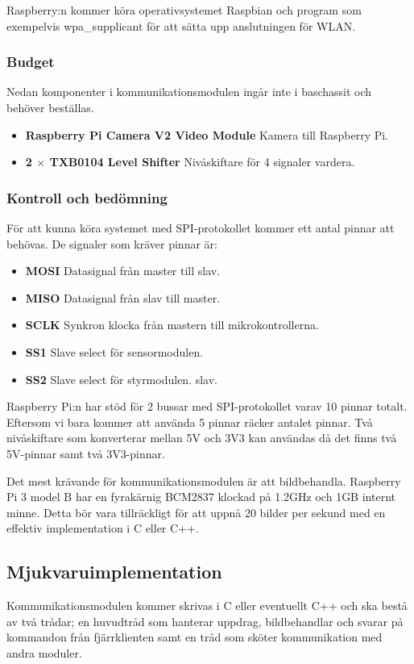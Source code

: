 \documentclass[designspec/spec.tex]{subfiles}
\begin{document}
Raspberry:n kommer köra operativsystemet Raspbian och program som exempelvis
wpa\_supplicant för att sätta upp anslutningen för WLAN.

\subsubsection{Budget}
    Nedan komponenter i kommunikationsmodulen ingår inte i baschassit och
    behöver beställas.
\begin{itemize}
    \item \textbf{Raspberry Pi Camera V2 Video Module} Kamera till Raspberry
    Pi.
    \item \textbf{2 $\times$ TXB0104 Level Shifter} Nivåskiftare för 4 signaler
    vardera.
\end{itemize}

\subsubsection{Kontroll och bedömning}
För att kunna köra systemet med SPI-protokollet kommer ett antal pinnar att
behövas. De signaler som kräver pinnar är:
\begin{itemize}
    \item \textbf{MOSI} Datasignal från master till slav.
    \item \textbf{MISO} Datasignal från slav till master.
    \item \textbf{SCLK} Synkron klocka från mastern till mikrokontrollerna.
    \item \textbf{SS1} Slave select för sensormodulen.
    \item \textbf{SS2} Slave select för styrmodulen.
    slav.
\end{itemize}

Raspberry Pi:n har stöd för 2 bussar med SPI-protokollet varav 10 pinnar
totalt. Eftersom vi bara kommer att använda 5 pinnar räcker antalet pinnar.
Två nivåskiftare som konverterar mellan 5V och 3V3 kan användas då det finns
två 5V-pinnar samt två 3V3-pinnar.

Det mest krävande för kommunikationsmodulen är att bildbehandla.  Raspberry Pi
3 model B har en fyrakärnig BCM2837 klockad på 1.2GHz och 1GB internt minne.
Detta bör vara tillräckligt för att uppnå 20 bilder per sekund med en effektiv
implementation i C eller C++.

\subsection{Mjukvaruimplementation}
Kommunikationsmodulen kommer skrivas i C eller eventuellt C++ och ska bestå av
två trådar; en huvudtråd som hanterar uppdrag, bildbehandlar och svarar på
kommandon från fjärrklienten samt en tråd som sköter kommunikation med andra
moduler.
\end{document}
